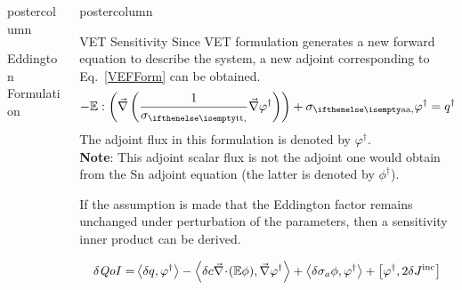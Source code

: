 \documentclass[xcolor={usenames,dvipsnames,svgnames,table}]{beamer}
\newcommand{\vr}{\vec{r}}
\newcommand{\bra}{\left\langle}
\newcommand{\ket}{\right\rangle}
\newcommand{\sbra}{\left[}
\newcommand{\sket}{\right]}
\newcommand{\bound}{\partial V}
\newcommand{\Edd}{\mathbb{E}}
\newcommand{\isigt}{c}
\newcommand{\scalResp}{q^\dag}
\newcommand{\qoi}{{\it QoI}\xspace}
\newlength{\columnheight}
\begin{document}
\begin{frame}
\begin{columns}
\begin{column}{.33\textwidth}
\begin{beamercolorbox}[center,wd=\textwidth]{postercolumn}
\begin{minipage}[T]{0.95\textwidth}
{\begin{block}{Eddington Formulation}
\end{block}
\vfill

			}
			\end{minipage}
		\end{beamercolorbox}
	\end{column}

	\begin{column}{.33\textwidth}
		\begin{beamercolorbox}[center,wd=\textwidth]{postercolumn}
			\begin{minipage}[T]{0.95\textwidth} %
			\parbox[t][\columnheight]{\textwidth}{ %


			    \begin{block}{VET Sensitivity}
Since VET formulation generates a new forward equation to describe the system, a new adjoint corresponding to Eq.~\eqref{VEFForm} can be obtained. 
\begin{equation}
\label{adjForm}
- \Edd : \left( \grad \left( \frac{1}{\sigt}\grad \varphi^\dag \right) \right) + \siga \varphi^\dag = \scalResp %
\end{equation}
The adjoint flux in this formulation is denoted by $\varphi^\dag$.\\
{\bf Note}:  This adjoint scalar flux is not the adjoint one would obtain from the Sn adjoint equation (the latter is denoted by $\phi^\dag$).

\vspace{1cm}
If the assumption is made that the Eddington factor remains unchanged under perturbation of the parameters, then a sensitivity inner product can be derived.


\begin{equation}
\label{SensIP1}
\begin{split}
\delta \qoi =&  \bra \delta q , \varphi^\dag \ket - \bra \delta \isigt \div (\Edd \phi), \grad \varphi^\dag \ket + \bra \delta \sigma_a \phi, \varphi^\dag \ket + \sbra \varphi^\dag, 2 \delta J^{\text{inc}} \sket \\
\end{split}
\end{equation}


\end{block}}
\end{minipage}
\end{beamercolorbox}
\end{column}
\end{columns}
\end{frame}
\end{document}
